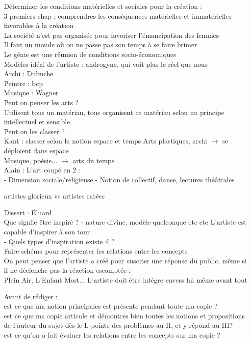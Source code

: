 \documentclass[a4paper,twocolumn,landscape]{article}
\begin{document}
Déterminer les conditions matérielles et sociales pour la création : \\
3 premiers chap : comprendres les conséquences matérielles et immatérielles favorables
à la création\\
La société n'est pas organisée pour favoriser l'émancipation des femmes\\
Il faut un monde où on ne passe pas son temps à se faire brimer\\
Le génie est une réunion de conditions socio-économiques \\
Modèles idéal de l'artiste : androgyne, qui voit plus le réel 
que nous \\

\noindent
Archi : Dubuche\\
Peintre : bcp\\
Musique : Wagner\\

\noindent
Peut on penser les arts ? \\
Utilisent tous un matériau, tous organisent ce matériau selon un principe
intellectuel et sensible.\\

\noindent
Peut on les classer ? \\
Kant : classer selon la notion espace et temps
Arts plastiques, archi \(\to\) se déploient dans espace\\
Musique, poésie... \(\to\) arts du temps \\

\noindent
Alain : L'art coupé en 2 :\\
- Dimension sociale/religieuse 
- Notion de collectif, danse, lectures théâtrales

artistes glorieux vs artistes ratées

Dissert : Éluard \\
Que signfie être inspiré ? 
- nature divine, modèle quelconque etc etc
L'artiste est capable d'inspirer à son tour \\
- Quels types d'inspiration existe il ? \\

\noindent
Faire schéma pour représenter les relations entre les concepts\\
On peut penser que l'artiste a créé pour susciter une réponse 
du public, même si il ne déclenche pas la réaction escomptée :\\
Plein Air, L'Enfant Mort...
L'artiste doit être intègre envers lui même avant tout 

\noindent
Avant de rédiger : \\
est ce que ma notion principales est présente pendant toute ma copie ? \\
est ce que ma copie articule et démontres bien toutes les notions et propositions de l'auteur du sujet dès le I, pointe des problèmes au II, et y répond au III?\\
est ce qu'on a fait évaluer les relations entre les concepts sur ma copie ? \\
\end{document}
